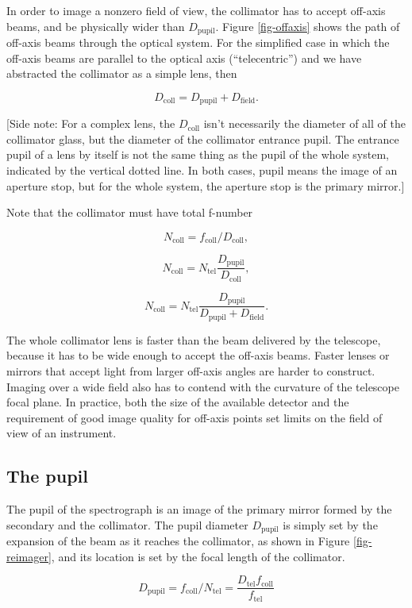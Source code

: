 \documentclass[12pt]{article}
\newcommand{\subscript}[1]{\mathrm{#1}}
\newcommand{\field}{\subscript{field}}
\newcommand{\tel}{\subscript{tel}}
\newcommand{\pupil}{\subscript{pupil}}
\newcommand{\coll}{\subscript{coll}}
\begin{document}
In order to image a nonzero field of view, the collimator
has to accept off-axis beams, and be physically wider than
$D_{\pupil}$.  Figure \ref{fig-offaxis} shows the path of off-axis
beams through the optical system.
For the simplified case in which 
the off-axis beams are parallel to the optical
axis (``telecentric'') and we have abstracted the collimator
as a simple lens, then

$$ D_{\coll} = D_{\pupil} + D_{\field}. $$

[Side note: For a complex lens, the $D_{\coll}$ isn't necessarily the diameter 
of all of the collimator glass, but the diameter of the 
collimator entrance pupil.  The entrance pupil of a lens by itself
is not the same thing as the pupil of the whole system,
indicated by the vertical dotted line.  In both cases, pupil means
the image of an aperture stop, but for the whole system, the aperture
stop is the primary mirror.]

Note that the collimator must have total f-number

$$ N_{\coll} = f_{\coll} / D_{\coll}, $$

$$ N_{\coll} = N_{\tel} \frac{D_{\pupil}}{D_{\coll}}, $$

$$ N_{\coll} = N_{\tel} \frac{D_{\pupil}}{D_{\pupil}+D_{\field}}. $$

The whole collimator lens is faster than the beam delivered 
by the telescope, because it has to be wide enough to accept 
the off-axis beams.  Faster lenses or mirrors
that accept light from larger off-axis angles are harder to
construct.  Imaging over a wide field also has to contend with the
curvature of the telescope focal plane.  In practice, both the
size of the available detector and the requirement of good image 
quality for off-axis points set limits on the field of view of an 
instrument.

\subsection{The pupil}

The pupil of the spectrograph is an image of the primary
mirror formed by the secondary and the collimator.
The pupil diameter $D_{\pupil}$ is simply set by the expansion
of the beam as it reaches the collimator, as shown in 
Figure \ref{fig-reimager}, and its location is set by 
the focal length of the collimator.

$$ D_{\pupil} = f_{\coll} / N_{\tel} = \frac{D_{\tel} f_{\coll}}{f_{\tel}} $$
\end{document}
